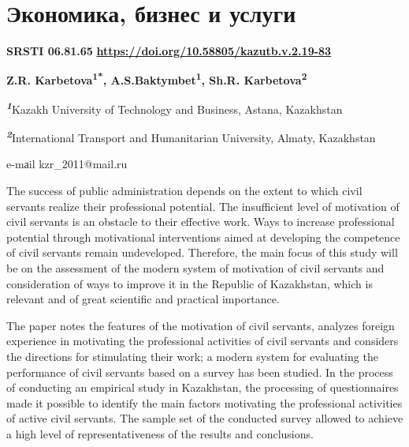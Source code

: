\let\cleardoublepage\clearpage
\chapter{Экономика, бизнес и услуги}

{\bfseries SRSTI 06.81.65}\hfill
\hfill {\bfseries \href{https://doi.org/10.58805/kazutb.v.2.19-83}{https://doi.org/10.58805/kazutb.v.2.19-83}}


\begin{center}
{\bfseries Z.R. Karbetova\textsuperscript{1*},
A.S.Baktymbet\textsuperscript{1}, Sh.R. Karbetova\textsuperscript{2}}

\emph{{\bfseries \textsuperscript{1}}}Kazakh University of Technology and
Business, Astana, Kazakhstan

\emph{{\bfseries \textsuperscript{2}}}International Transport and
Humanitarian University, Almaty, Kazakhstan

e-mаil kzr\_2011@mail.ru
\end{center}

\hspace{1.5em} The success of public administration depends on the extent to which
civil servants realize their professional potential. The insufficient
level of motivation of civil servants is an obstacle to their effective
work. Ways to increase professional potential through motivational
interventions aimed at developing the competence of civil servants
remain undeveloped. Therefore, the main focus of this study will be on
the assessment of the modern system of motivation of civil servants and
consideration of ways to improve it in the Republic of Kazakhstan, which
is relevant and of great scientific and practical importance.

The paper notes the features of the motivation of civil servants,
analyzes foreign experience in motivating the professional activities of
civil servants and considers the directions for stimulating their work;
a modern system for evaluating the performance of civil servants based
on a survey has been studied. In the process of conducting an empirical
study in Kazakhstan, the processing of questionnaires made it possible
to identify the main factors motivating the professional activities of
active civil servants. The sample set of the conducted survey allowed to
achieve a high level of representativeness of the results and
conclusions.

